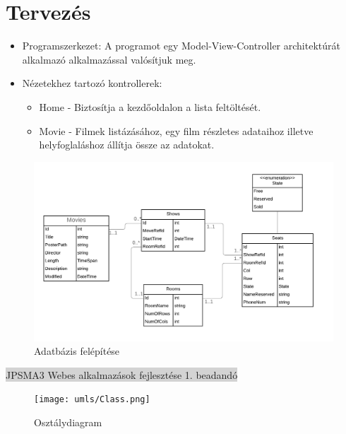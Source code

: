 \documentclass[11pt,a4paper]{article}
\begin{document}
\section{Tervezés}
\begin{itemize}
	\item Programszerkezet: A programot egy Model-View-Controller architektúrát
	alkalmazó alkalmazással valósítjuk meg.
	\item Nézetekhez tartozó kontrollerek:
	\begin{itemize}
		\item Home - Biztosítja a kezdőoldalon a lista feltöltését.
		\item Movie - Filmek listázásához, egy film részletes adataihoz illetve
		helyfoglaláshoz állítja össze az adatokat.
	\end{itemize}
\end{itemize}
\begin{figure}[h]
	\centering
	\includegraphics[width=13cm]{umls/Entity.png}
	\caption{Adatbázis felépítése}
\end{figure}
\newpage
\thispagestyle{empty}
\begin{center}
\colorbox{lightgray}{{\large JPSMA3} \hspace{3cm} {\large Webes alkalmazások fejlesztése 1. beadandó} \hspace{5cm} \thepage}
\end{center}
\begin{figure}[h]
\centering
\texttt{[image: umls/Class.png]}
\caption{Osztálydiagram}
\end{figure}
\end{document}
